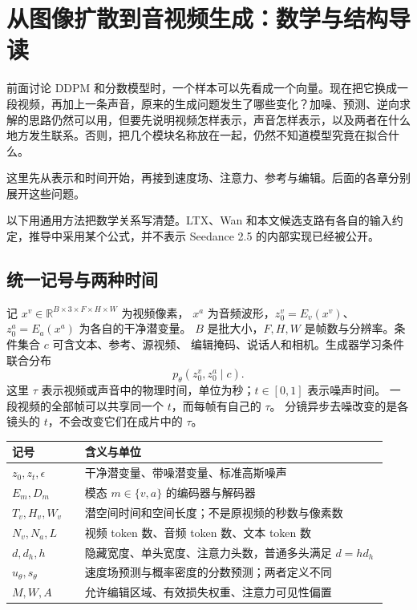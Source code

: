 \chapter{从图像扩散到音视频生成：数学与结构导读}
\label{seedance-primer}

前面讨论 DDPM 和分数模型时，一个样本可以先看成一个向量。现在把它换成一段视频，再加上一条声音，原来的生成问题发生了哪些变化？加噪、预测、逆向求解的思路仍然可以用，但要先说明视频怎样表示，声音怎样表示，以及两者在什么地方发生联系。否则，把几个模块名称放在一起，仍然不知道模型究竟在拟合什么。

这里先从表示和时间开始，再接到速度场、注意力、参考与编辑。后面的各章分别展开这些问题。

以下用通用方法把数学关系写清楚。LTX、Wan 和本文候选支路有各自的输入约定，推导中采用某个公式，并不表示 Seedance 2.5 的内部实现已经被公开。

\section{统一记号与两种时间}

记 $x^v\in\mathbb R^{B\times3\times F\times H\times W}$ 为视频像素，
$x^a$ 为音频波形，$z_0^v=E_v(x^v)$、$z_0^a=E_a(x^a)$ 为各自的干净潜变量。
$B$ 是批大小，$F,H,W$ 是帧数与分辨率。条件集合 $c$ 可含文本、参考、源视频、
编辑掩码、说话人和相机。生成器学习条件联合分布
\[
 p_\theta(z_0^v,z_0^a\mid c).
\]
这里 $\tau$ 表示视频或声音中的物理时间，单位为秒；$t\in[0,1]$ 表示噪声时间。
一段视频的全部帧可以共享同一个 $t$，而每帧有自己的 $\tau$。
分镜异步去噪改变的是各镜头的 $t$，不会改变它们在成片中的 $\tau$。

\begin{longtable}{@{}p{0.18\linewidth}p{0.75\linewidth}@{}}
\toprule 记号 & 含义与单位 \\ \midrule
$z_0,z_t,\epsilon$ & 干净潜变量、带噪潜变量、标准高斯噪声 \\
$E_m,D_m$ & 模态 $m\in\{v,a\}$ 的编码器与解码器 \\
$T_v,H_v,W_v$ & 潜空间时间和空间长度；不是原视频的秒数与像素数 \\
$N_v,N_a,L$ & 视频 token 数、音频 token 数、文本 token 数 \\
$d,d_h,h$ & 隐藏宽度、单头宽度、注意力头数，普通多头满足 $d=hd_h$ \\
$u_\theta,s_\theta$ & 速度场预测与概率密度的分数预测；两者定义不同 \\
$M,W,A$ & 允许编辑区域、有效损失权重、注意力可见性偏置 \\
\bottomrule
\end{longtable}

